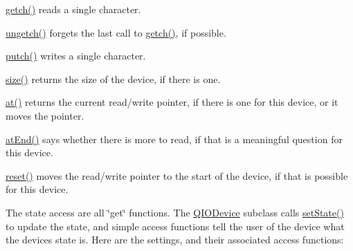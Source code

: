 \begin{DoxyItemize}
\item \hyperlink{class_q_i_o_device_a7cef61d66023f9cda6b0912082bd19fc}{getch()} reads a single character.


\item \hyperlink{class_q_i_o_device_aae3d67422103e8fc0411297b1d62c29a}{ungetch()} forgets the last call to \hyperlink{class_q_i_o_device_a7cef61d66023f9cda6b0912082bd19fc}{getch()}, if possible.


\item \hyperlink{class_q_i_o_device_a5de5c1c1cba7ca36ba93289e30cd3029}{putch()} writes a single character.


\item \hyperlink{class_q_i_o_device_ab94989478f8bd6742f6bfcd27926341e}{size()} returns the size of the device, if there is one.


\item \hyperlink{class_q_i_o_device_ae87e9d1d92b870e96ed04de97d7638f3}{at()} returns the current read/write pointer, if there is one for this device, or it moves the pointer.


\item \hyperlink{class_q_i_o_device_a857ac5294bd88a1308e4c998af81f490}{at\+End()} says whether there is more to read, if that is a meaningful question for this device.


\item \hyperlink{class_q_i_o_device_ac2f29866602352c08b3d3cb3f1fdc7e2}{reset()} moves the read/write pointer to the start of the device, if that is possible for this device.


\end{DoxyItemize}The state access are all \char`\"{}get\char`\"{} functions. The \hyperlink{class_q_i_o_device}{Q\+I\+O\+Device} subclass calls \hyperlink{class_q_i_o_device_ab8a455c1e81b3382c5db9a65ea70e615}{set\+State()} to update the state, and simple access functions tell the user of the device what the device\textquotesingle{}s state is. Here are the settings, and their associated access functions\+: 
